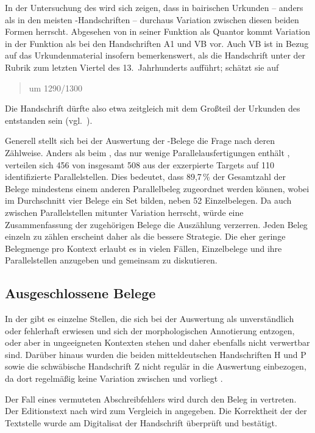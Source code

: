In der Untersuchung des \CAO{} wird sich zeigen, dass in
bairischen Urkunden -- anders als in den meisten
\KC{}-Handschriften -- durchaus Variation zwischen diesen beiden Formen
herrscht. Abgesehen von  in seiner Funktion als Quantor kommt
Variation in der Funktion als  bei den Handschriften A1 und VB
vor. Auch VB ist in Bezug auf das Urkundenmaterial insofern bemerkenswert, als
\citet[224]{schneider1987} die Handschrift unter der Rubrik zum letzten Viertel
des 13.~Jahrhunderts aufführt; \citet[65]{wolf:kckat} schätzt sie auf
\blockquote{um 1290/1300}. Die Handschrift dürfte also etwa
zeitgleich mit dem Großteil der Urkunden des \CAO{} entstanden sein
(vgl.~).

Generell stellt sich bei der Auswertung der \KC{}-Belege die Frage nach deren
Zählweise. Anders als beim \CAO{}, das nur wenige Parallelausfertigungen
enthält \autocite[vgl.][326--328]{ganslmayeretal2003}, verteilen sich 456 von
insgesamt 508 aus der \KC{} exzerpierte Targets auf 110
identifizierte Parallelstellen. Dies bedeutet, dass 89,7\,\% der Gesamtzahl der
Belege mindestens einem anderen Parallelbeleg zugeordnet werden können, wobei
im Durchschnitt vier Belege ein Set bilden, neben 52 Einzelbelegen. Da auch
zwischen Parallelstellen mitunter Variation herrscht, würde eine
Zusammenfassung der zugehörigen Belege die Auszählung verzerren. Jeden Beleg
einzeln zu zählen erscheint daher als die bessere Strategie. Die eher geringe
Belegmenge pro Kontext erlaubt es in vielen Fällen, Einzelbelege und ihre
Parallelstellen anzugeben und gemeinsam zu diskutieren.

\subsection{Ausgeschlossene Belege}
\label{subsec:ausgeschlossene_kc}

In der \KC{} gibt es einzelne Stellen, die sich bei der Auswertung als
unverständlich oder fehlerhaft erwiesen und sich der morphologischen
Annotierung entzogen, oder aber in ungeeigneten Kontexten stehen und daher
ebenfalls nicht verwertbar sind. Darüber hinaus wurden die beiden
mitteldeutschen Handschriften H und P sowie die
schwäbische Handschrift Z nicht regulär in die Auswertung
einbezogen, da dort regelmäßig keine Variation zwischen  und
 vorliegt \autocite[vgl. auch][183]{ksw2}.

Der Fall eines vermuteten Abschreibfehlers wird durch den Beleg in
 vertreten. Der Editionstext nach \citet{schroeder1895}
wird zum Vergleich in  angegeben. Die Korrektheit der
 der Textstelle wurde am Digitalisat der
Handschrift überprüft und bestätigt.

